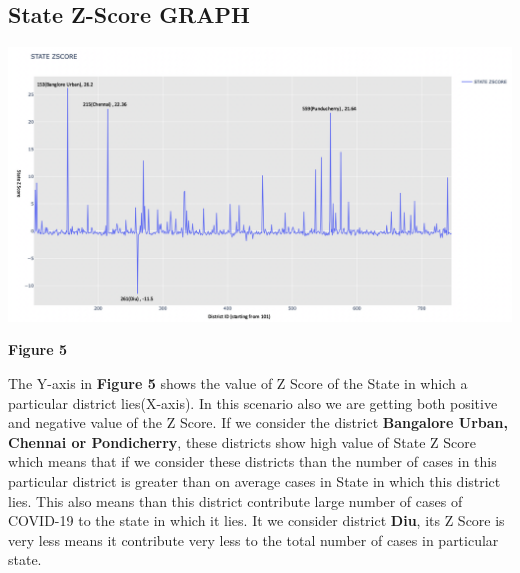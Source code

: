 \documentclass{report}
\begin{document}
\subsection{State Z-Score GRAPH}
\includegraphics[scale=0.33]{images/State Z Score.png}
\centerline{\textbf{Figure 5}} \newline\newline
\justify The Y-axis in \textbf{Figure 5} shows the value of Z Score of the State in which a particular district lies(X-axis). In this scenario also we are getting both positive and negative value of the Z Score. 
\newline If we consider the district \textbf{Bangalore Urban, Chennai or Pondicherry}, these districts show high value of State Z Score which means that if we consider these districts than the number of cases in this particular district is greater than on average cases in State in which this district lies. This also means than this district contribute large number of cases of COVID-19 to the state in which it lies.
\newline It we consider district \textbf{Diu}, its Z Score is very less means it contribute very less to the total number of cases in particular state.

\newpage
\end{document}
